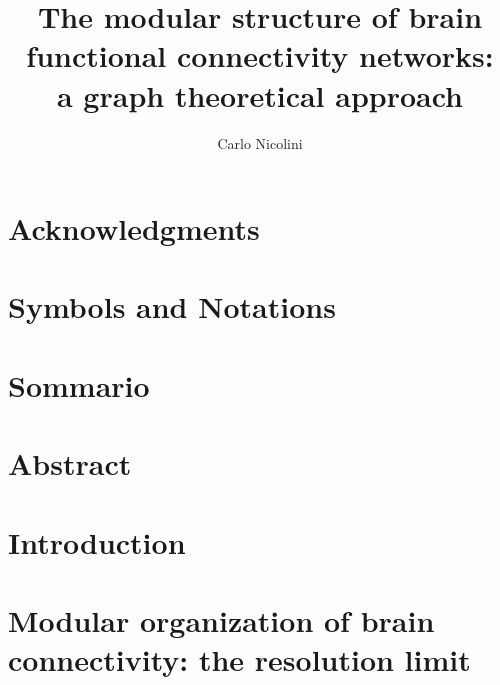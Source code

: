 
%

\title{The modular structure of brain functional connectivity networks:\\a graph theoretical approach}
\author{Carlo Nicolini}


\newtheorem{obs}{Observation}
\newtheorem{props}{Proposition}
\newenvironment{bottompar}{\par\vspace*{\fill}}{\clearpage}


%
\afterpage{\blankpage}

{}

\tableofcontents

\chapter*{Acknowledgments}


\chapter*{Symbols and Notations}


\chapter*{Sommario}



\chapter*{Abstract}


\chapter{Introduction}\label{chap:introduction}


\chapter{Modular organization of brain connectivity: the resolution limit}
\label{chap:modularorganization}
\vspace{2em}


